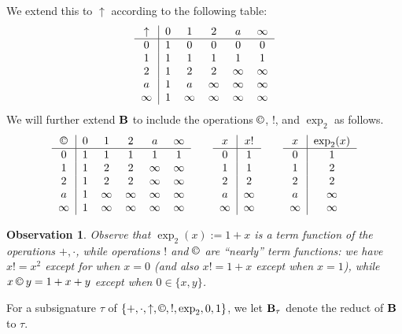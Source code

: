 \documentclass[eqnor,reqno]{amsart}
\theoremstyle{plain}
\newtheorem{obs}[thm]{Observation}
\theoremstyle{definition}
\newcommand{\cc}{\mathbin{\textup{\copyright}}}
\newcommand{\up}[1]{\textup{#1}}
\begin{document}
We extend this to $\uparrow$ according to the following table:
\[
\begin{tabular}{c|ccccc}
$\uparrow$&$0$&$1$&$2$&$a$&$\infty$\\
\hline
0&1&0&0&0&0\\
1&1&1&$1$&$1$&$1$\\
2&1&2&$2$&$\infty$&$\infty$\\
$a$&1&$a$&$\infty$&$\infty$&$\infty$\\
$\infty$&1&$\infty$&$\infty$&$\infty$&$\infty$\\
\end{tabular}
\]
We will further extend ${\bf B}$ to include the operations $\cc$, $!$, and $\exp_2$ as follows.
\[
\begin{tabular}{c|ccccc}
$\cc$&$0$&$1$&$2$&$a$&$\infty$\\
\hline
0&1&1&1&1&1\\
1&1&2&$2$&$\infty$&$\infty$\\
2&1&2&$2$&$\infty$&$\infty$\\
$a$&1&$\infty$&$\infty$&$\infty$&$\infty$\\
$\infty$&1&$\infty$&$\infty$&$\infty$&$\infty$\\
\end{tabular}
\qquad
\begin{tabular}{c|c}
$x$&$x!$\\
\hline
0&1\\
1&1\\
2&2\\
$a$&$\infty$\\
$\infty$&$\infty$
\end{tabular}
\qquad
\begin{tabular}{c|c}
$x$&$\exp_2(x)$\\
\hline
0&1\\
1&2\\
2&2\\
$a$&$\infty$\\
$\infty$&$\infty$\\
\end{tabular}
\]
\begin{obs}\label{obs:subsig}
Observe that $\exp_2(x):=1+x$ is a term function of the operations $+,\cdot$, while operations $!$ and $\cc$ are ``nearly'' term functions: we have $x!=x^2$ except for when $x=0$ \up(and also $x!=1+x$ except when $x=1$\up{),} while $x\cc y=1+x+y$ except when $0\in \{x,y\}$.
\end{obs}
For a subsignature $\tau$ of $\{+,\cdot,\uparrow,\cc,!,\exp_2,0,1\}$, we let ${\bf B}_\tau$ denote the reduct of ${\bf B}$ to $\tau$.
\end{document}
